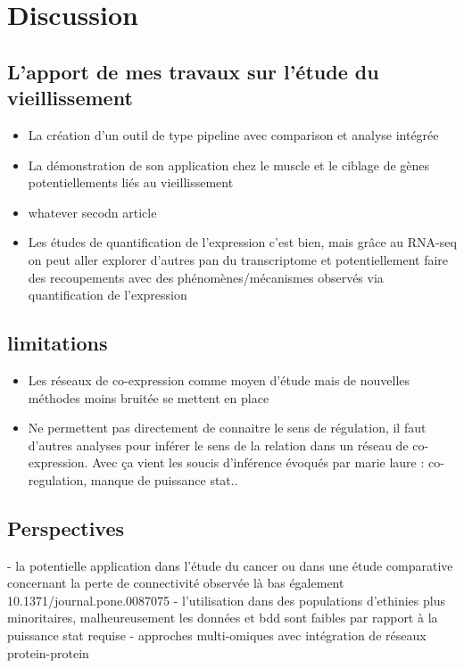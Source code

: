 \setcounter{chapter}{5}
\setcounter{section}{0}
\setcounter{figure}{0}   
\chapter*{Discussion}         %

\section{L'apport de mes travaux sur l'étude du vieillissement}

\begin{itemize}
    \item La création d'un outil de type pipeline avec comparison et analyse intégrée
    \item La démonstration de son application chez le muscle et le ciblage de gènes potentiellements liés au vieillissement
    \item whatever secodn article
    \item Les études de quantification de l'expression c'est bien, mais grâce au RNA-seq on peut aller explorer d'autres pan du transcriptome et potentiellement faire des recoupements avec des phénomènes/mécanismes observés via quantification de l'expression
\end{itemize}

\section{limitations}
\begin{itemize}
    \item Les réseaux de co-expression comme moyen d'étude mais de nouvelles méthodes moins bruitée se mettent en place %
    \item Ne permettent pas directement de connaitre le sens de régulation, il faut d'autres analyses pour inférer le sens de la relation dans un réseau de co-expression. Avec ça vient les soucis d'inférence évoqués par marie laure : co-regulation, manque de puissance stat..
\end{itemize}



\section{Perspectives}

- la potentielle application dans l'étude du cancer ou dans une étude comparative concernant la perte de connectivité observée là bas également 10.1371/journal.pone.0087075
- l'utilisation dans des populations d'ethinies plus minoritaires, malheureusement les données et bdd sont faibles par rapport à la puissance stat requise
- approches multi-omiques avec intégration de réseaux protein-protein %